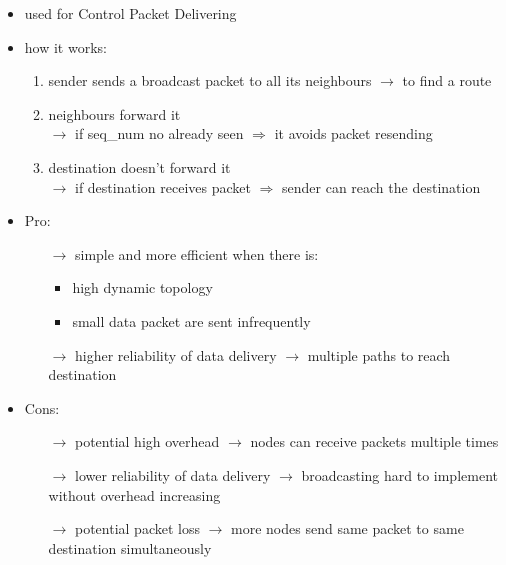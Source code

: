 \begin{itemize}
    \item used for Control Packet Delivering
    \item how it works:
    \begin{enumerate}
        \vspace*{-0.05cm}\item sender sends a broadcast packet to all its neighbours $\rightarrow$ to find a route
        \vspace*{-0.05cm}\item neighbours forward it \\$\rightarrow$ if seq\_num no already seen $\Rightarrow$ it avoids packet resending
        \vspace*{-0.05cm}\item destination doesn't forward it \\$\rightarrow$ if destination receives packet $\Rightarrow$ sender can reach the destination
    \end{enumerate}
    \item Pro:
    \begin{itemize}
        \vspace*{-0.05cm}\item[$\rightarrow$] simple and more efficient when there is:
        \begin{itemize}
            \vspace*{-0.05cm}\item high dynamic topology
            \vspace*{-0.05cm}\item small data packet are sent infrequently
        \end{itemize}
        \vspace*{-0.05cm}\item[$\rightarrow$] higher reliability of data delivery $\rightarrow$ multiple paths to reach destination
    \end{itemize}
    \item Cons:
    \begin{itemize}
        \vspace*{-0.05cm}\item[$\rightarrow$] potential high overhead $\rightarrow$ nodes can receive packets multiple times
        \vspace*{-0.05cm}\item[$\rightarrow$] lower reliability of data delivery $\rightarrow$ broadcasting hard to implement\\without overhead increasing
        \vspace*{-0.05cm}\item[$\rightarrow$] potential packet loss $\rightarrow$ more nodes send same packet to same destination simultaneously
    \end{itemize}
\end{itemize}

